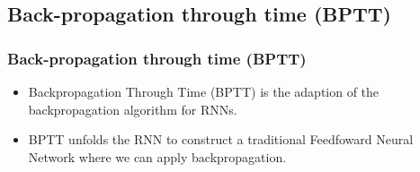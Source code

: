 \documentclass[
	11pt,
]{beamer}
\begin{document}
\subsection{Back-propagation through time (BPTT)}

\begin{frame}
	\frametitle{Back-propagation through time (BPTT)}
	\begin{itemize}
		\item Backpropagation Through Time (BPTT) is the adaption of the backpropagation algorithm for RNNs.
		\bigskip 
		\item BPTT unfolds the RNN to construct a traditional Feedfoward Neural Network where we can apply backpropagation.
        \bigskip %
		\par
		\hfill
		\par

			
\end{itemize}
\end{frame}

\end{document}
